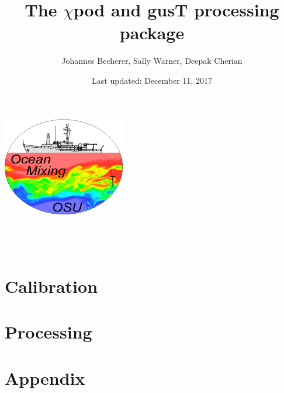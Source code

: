\documentclass[12pt]{report}
\title{The $\chi$pod and gusT processing package}
\author{Johannes Becherer, Sally Warner, Deepak Cherian}
\date{Last updated: December 11, 2017}
\makeatletter
\def\makenewtitle{{
\thispagestyle{plain}
\centering
\includegraphics[width=0.4\textwidth]{figs/omg_logo.png} \\[23ex]
\vspace*{\fill}
{\Huge \@title }\\[4ex]
{\large  \@author}\\[4ex]
\@date\\
\vspace*{\fill}}}
\makeatother
\begin{document}
\pagestyle{fancy}

\makenewtitle
\tableofcontents

\part{Calibration}



\part{Processing}







\appendix
\part{Appendix}




\end{document}
